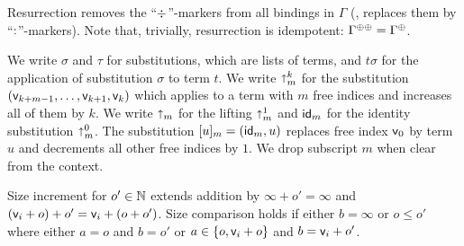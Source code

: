 \documentclass[acmlarge,review,anonymous]{acmart}\settopmatter{printfolios=true}
\begin{document}
Resurrection\cite{pfenning:lics01} \fbox{$\resurrect\Gamma$} removes
the ``$\mathord{\div}$''-markers from all bindings in $\Gamma$ (\ie, replaces
them by ``$\mathord{:}$''-markers).  Note that, trivially, resurrection is idempotent: $\resurrecttwice\Gamma = \resurrect{\Gamma}$.

We write $\sigma$ and $\tau$ for substitutions, which are lists of terms, and $t \sigma$ for the application of substitution $\sigma$ to term $t$.  We write $\mathord{\shortuparrow}^k_m$ for the substitution $(\mathsf{v}_{k+m-1},\dots,\mathsf{v}_{k+1},\mathsf{v}_{k})$ which applies to a term with $m$ free indices and increases all of them by $k$.  We write $\mathord{\shortuparrow}_m$ for the lifting $\mathord{\shortuparrow}^1_m$ and $\mathsf{id}_m$ for the identity substitution $ \mathord{\shortuparrow}^0_m$. The substitution $[u]_m = (\mathsf{id}_m, u)$ replaces free index $\mathsf{v}_{0}$ by term $u$ and decrements all other free indices by $1$. We drop subscript $m$ when clear from the context.

Size increment  for $o' \in \mathbb{N}$ extends addition by $\infty + o' = \infty$ and $(\mathsf{v}_{i} + o) + o' = \mathsf{v}_{i} + (o + o')$.  Size comparison  holds if either $b = \infty$ or  $o \leq o'$ where either $a = o$ and $b = o'$ or $a \in \{ o, \mathsf{v}_{i} + o \}$ and $b = \mathsf{v}_{i} + o'$.
\end{document}
